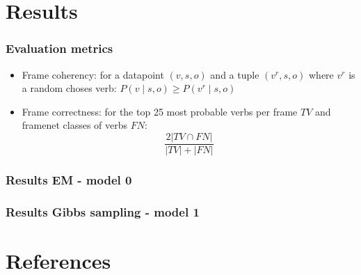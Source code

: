\documentclass{beamer}
\begin{document}
\section{Results}

\begin{frame}
  \frametitle{Evaluation metrics}
  \begin{itemize}
  \item Frame coherency: for a datapoint $(v,s,o)$ and a tuple $(v^r,s,o)$ where $v^r$ is a random choses verb: $P(v\mid s,o) \geq P(v^r\mid s,o)$  
  \item Frame correctness: for the top 25 most probable verbs per frame $TV$ and framenet classes of verbs $FN$: \[\frac{2|TV\cap FN|}{|TV|+|FN|}\]
  \end{itemize}
\end{frame}

\begin{frame}
  \frametitle{Results EM - model 0}
\end{frame}

\begin{frame}
  \frametitle{Results Gibbs sampling - model 1}
\end{frame}

\section{References}
\begin{frame}[t,allowframebreaks]
\nocite{*}

\end{frame}
\end{document}
